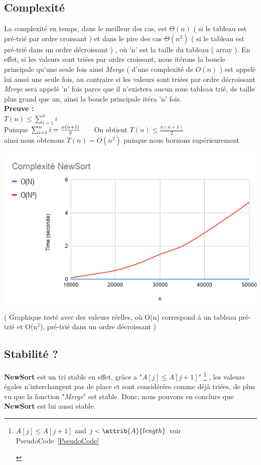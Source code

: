 \documentclass[a4paper, 11pt, oneside]{article}
\begin{document}
\subsection{Complexité}
La complexité en temps, dans le meilleur des cas, est $\Theta(n)$ ( si le tableau est pré-trié par ordre croissant ) et dans le pire des cas $\Theta(n^{2})$ ( si le tableau est pré-trié dans un ordre décroissant ) , où 'n' est la taille du tableau ( array ). En effet, si les valeurs sont triées par ordre croissant, nous itérons la boucle principale qu'une seule fois ainsi \textit{Merge} ( d'une complexité de $O(n)$ ) est appelé lui aussi une seule fois, au contraire si  les valeurs sont triées par ordre décroissant \textit{Merge} sera appelé 'n' fois parce que il n'existera aucun sous tableau trié, de taille plus grand que un, ainsi la boucle principale itéra 'n' fois.   \\ 
\textbf{Preuve :}\\ $T(n) \leq \sum_{i = 1}^{n} i$ \\ \indent Puisque \indent$\sum_{i = 1}^{n} i = \frac{n(n+1)}{2} \\ \indent$ On obtient $T(n) \leq \frac{n(n+1)}{2}$ \\
\indent ainsi nous obtenons $T(n) = O(n^{2})$ puisque nous bornons supérieurement

\includegraphics[scale=0.6]{graphique.png} \\
( Graphique testé avec des valeurs réelles, où O(n) correspond à un tableau pré-trié et O(n$^{2}$), pré-trié dans un ordre décroissant ) 


\subsection{Stabilité ?}
\textbf{NewSort}
 est un tri stable en effet, grâce a "\textit{$A[j]\leq A[j+1]$}"
	\footnote{\begin{codebox}
	\While $A[j] \leq A[j+1]$ and $j < \attrib{A}{length}$
voir PseudoCode~\ref{PseudoCode}
\End
\end{codebox} }
, les valeurs égales n'interchangent pas de place et sont considérées comme déjà triées, de plus vu que la fonction "\textit{Merge}" est stable. Donc, nous pouvons en conclure que \textbf{NewSort} est lui aussi stable. 
\end{document}
